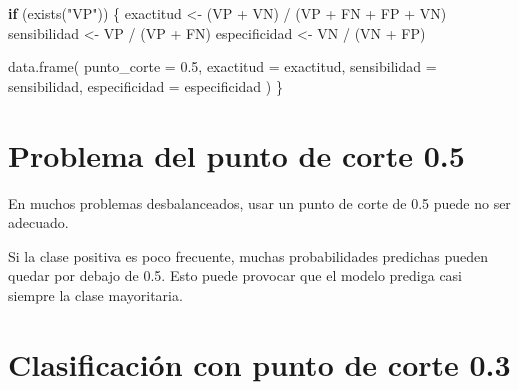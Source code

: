 \documentclass[
  11pt,
  letterpaper,
]{book}
\newenvironment{Shaded}{\begin{snugshade}}{\end{snugshade}}
\newcommand{\AttributeTok}[1]{\textcolor[rgb]{0.40,0.45,0.13}{#1}}
\newcommand{\ControlFlowTok}[1]{\textcolor[rgb]{0.00,0.23,0.31}{\textbf{#1}}}
\newcommand{\FloatTok}[1]{\textcolor[rgb]{0.68,0.00,0.00}{#1}}
\newcommand{\FunctionTok}[1]{\textcolor[rgb]{0.28,0.35,0.67}{#1}}
\newcommand{\NormalTok}[1]{\textcolor[rgb]{0.00,0.23,0.31}{#1}}
\newcommand{\OtherTok}[1]{\textcolor[rgb]{0.00,0.23,0.31}{#1}}
\newcommand{\SpecialCharTok}[1]{\textcolor[rgb]{0.37,0.37,0.37}{#1}}
\newcommand{\StringTok}[1]{\textcolor[rgb]{0.13,0.47,0.30}{#1}}
\begin{document}
\begin{Shaded}
\begin{Highlighting}[]
\ControlFlowTok{if}\NormalTok{ (}\FunctionTok{exists}\NormalTok{(}\StringTok{"VP"}\NormalTok{)) \{}
\NormalTok{  exactitud }\OtherTok{\textless{}{-}}\NormalTok{ (VP }\SpecialCharTok{+}\NormalTok{ VN) }\SpecialCharTok{/}\NormalTok{ (VP }\SpecialCharTok{+}\NormalTok{ FN }\SpecialCharTok{+}\NormalTok{ FP }\SpecialCharTok{+}\NormalTok{ VN)}
\NormalTok{  sensibilidad }\OtherTok{\textless{}{-}}\NormalTok{ VP }\SpecialCharTok{/}\NormalTok{ (VP }\SpecialCharTok{+}\NormalTok{ FN)}
\NormalTok{  especificidad }\OtherTok{\textless{}{-}}\NormalTok{ VN }\SpecialCharTok{/}\NormalTok{ (VN }\SpecialCharTok{+}\NormalTok{ FP)}

  \FunctionTok{data.frame}\NormalTok{(}
    \AttributeTok{punto\_corte =} \FloatTok{0.5}\NormalTok{,}
    \AttributeTok{exactitud =}\NormalTok{ exactitud,}
    \AttributeTok{sensibilidad =}\NormalTok{ sensibilidad,}
    \AttributeTok{especificidad =}\NormalTok{ especificidad}
\NormalTok{  )}
\NormalTok{\}}
\end{Highlighting}
\end{Shaded}

\section{Problema del punto de corte
0.5}\label{problema-del-punto-de-corte-0.5}

En muchos problemas desbalanceados, usar un punto de corte de 0.5 puede
no ser adecuado.

Si la clase positiva es poco frecuente, muchas probabilidades predichas
pueden quedar por debajo de 0.5. Esto puede provocar que el modelo
prediga casi siempre la clase mayoritaria.

\section{Clasificación con punto de corte
0.3}\label{clasificaciuxf3n-con-punto-de-corte-0.3}

\begin{Shaded}
\end{Shaded}
\end{document}
